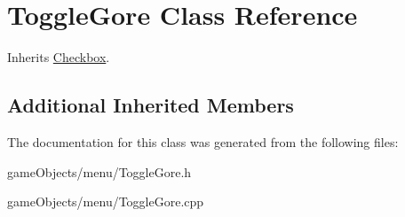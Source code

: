 \hypertarget{class_toggle_gore}{\section{Toggle\+Gore Class Reference}
\label{class_toggle_gore}
}


Inherits \hyperlink{class_checkbox}{Checkbox}.

\subsection*{Additional Inherited Members}


The documentation for this class was generated from the following files\+:\begin{DoxyCompactItemize}
\item 
game\+Objects/menu/Toggle\+Gore.\+h\item 
game\+Objects/menu/Toggle\+Gore.\+cpp\end{DoxyCompactItemize}
